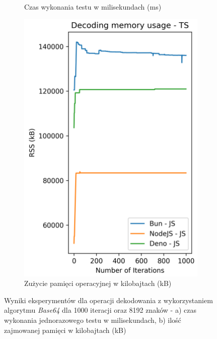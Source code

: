 \begin{figure}[H]
\begin{subfigure}[b]{0.42\textwidth}
    \caption{Czas wykonania testu w milisekundach (ms)}
    \label{fig:decoding_e2_js_time}
  \end{subfigure}
  \begin{subfigure}[b]{0.42\textwidth}
    \centering
    \includegraphics[width=\textwidth]{Figures/coding/base64_1000_decoding_js_memory.png}
    \caption{Zużycie pamięci operacyjnej w kilobajtach (kB)}
    \label{fig:decoding_e2_js_memory}
  \end{subfigure}
  \hfill
  \caption{Wyniki eksperymentów dla operacji dekodowania z wykorzystaniem algorytmu \textit{Base64} dla 1000 iteracji oraz 8192 znaków - a) czas wykonania jednorazowego testu w milisekundach, b) ilość zajmowanej pamięci w kilobajtach (kB)}
  \label{fig:decoding_e2_js}
\end{figure}

